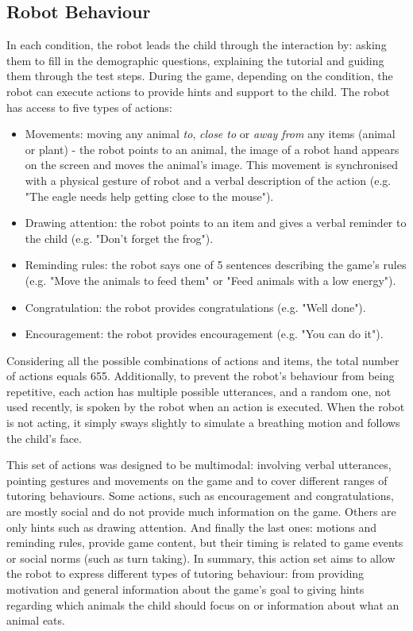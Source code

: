 \subsection{Robot Behaviour} \label{sec:tuto_robot}
In each condition, the robot leads the child through the interaction by: asking them to fill in the demographic questions, explaining the tutorial and guiding them through the test steps. During the game, depending on the condition, the robot can execute actions to provide hints and support to the child. The robot has access to five types of actions:
\begin{itemize}
	\item Movements: moving any animal \emph{to}, \emph{close to} or \emph{away from} any items (animal or plant) - the robot points to an animal, the image of a robot hand appears on the screen and moves the animal's image. This movement is synchronised with a physical gesture of robot and a verbal description of the action (e.g. "The eagle needs help getting close to the mouse").
	\item Drawing attention: the robot points to an item and gives a verbal reminder to the child (e.g. "Don't forget the frog").
	\item Reminding rules: the robot says one of 5 sentences describing the game's rules (e.g. "Move the animals to feed them" or "Feed animals with a low energy").
	\item Congratulation: the robot provides congratulations (e.g. "Well done").
	\item Encouragement: the robot provides encouragement (e.g. "You can do it").
\end{itemize}
Considering all the possible combinations of actions and items, the total number of actions equals 655. Additionally, to prevent the robot's behaviour from being repetitive, each action has multiple possible utterances, and a random one, not used recently, is spoken by the robot when an action is executed. When the robot is not acting, it simply sways slightly to simulate a breathing motion and follows the child's face. 

This set of actions was designed to be multimodal: involving verbal utterances, pointing gestures and movements on the game and to cover different ranges of tutoring behaviours. Some actions, such as encouragement and congratulations, are mostly social and do not provide much information on the game. Others are only hints such as drawing attention. And finally the last ones: motions and reminding rules, provide game content, but their timing is related to game events or social norms (such as turn taking). In summary, this action set aims to allow the robot to express different types of tutoring behaviour: from providing motivation and general information about the game's goal to giving hints regarding which animals the child should focus on or information about what an animal eats. %

